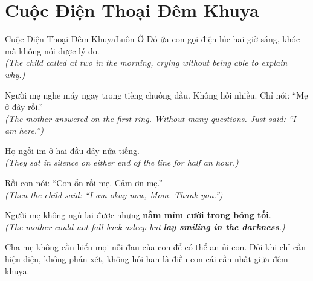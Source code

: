 \section{Cuộc Điện Thoại Đêm Khuya}
\begin{truyen}{Cuộc Điện Thoại Đêm Khuya}{Luôn Ở Đó}
ứa con gọi điện lúc hai giờ sáng, khóc mà không nói được lý do.\\
\textit{(The child called at two in the morning, crying without being able to explain why.)}

Người mẹ nghe máy ngay trong tiếng chuông đầu. Không hỏi nhiều. Chỉ nói: ``Mẹ ở đây rồi.''\\
\textit{(The mother answered on the first ring. Without many questions. Just said: ``I am here.'')}

Họ ngồi im ở hai đầu dây nửa tiếng.\\
\textit{(They sat in silence on either end of the line for half an hour.)}

Rồi con nói: ``Con ổn rồi mẹ. Cảm ơn mẹ.''\\
\textit{(Then the child said: ``I am okay now, Mom. Thank you.'')}

Người mẹ không ngủ lại được nhưng \textbf{nằm mỉm cười trong bóng tối}.\\
\textit{(The mother could not fall back asleep but \textbf{lay smiling in the darkness}.)}
\end{truyen}
\begin{baihoc}
  Cha mẹ không cần hiểu mọi nỗi đau của con để có thể an ủi con. Đôi khi chỉ cần hiện diện, không phán xét, không hỏi han là điều con cái cần nhất giữa đêm khuya.
\end{baihoc}

